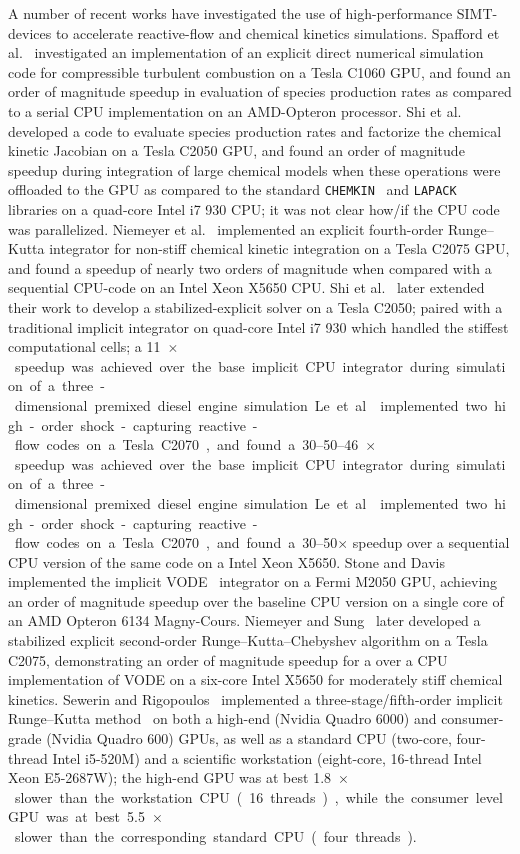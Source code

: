 \documentclass[12pt,number,sort&compress,preprint]{elsarticle}
\begin{document}
A number of recent works have investigated the use of high-performance SIMT-devices to accelerate reactive-flow and chemical kinetics simulations.
Spafford et al.~\cite{Spafford:2010aa} investigated an implementation of an explicit direct numerical simulation code for compressible turbulent combustion on a Tesla C1060 GPU, and found an order of magnitude speedup in evaluation of species production rates as compared to a serial CPU implementation on an AMD-Opteron processor.
Shi et al.~\cite{Shi:2011aa} developed a code to evaluate species production rates and factorize the chemical kinetic Jacobian on a Tesla C2050 GPU, and found an order of magnitude speedup during integration of large chemical models when these operations were offloaded to the GPU as compared to the standard \texttt{CHEMKIN}~\cite{kee1989chemkin} and \texttt{LAPACK}~\cite{Anderson:1999aa} libraries on a quad-core Intel i7 930 CPU; it was not clear how\slash if the CPU code was parallelized.
Niemeyer et al.~\cite{Niemeyer:2011aa} implemented an explicit fourth-order Runge--Kutta integrator for non-stiff chemical kinetic integration on a Tesla C2075 GPU, and found a speedup of nearly two orders of magnitude when compared with a sequential CPU-code on an Intel Xeon X5650 CPU.
Shi et al.~\cite{Shi:2012aa} later extended their work to develop a stabilized-explicit solver on a Tesla C2050; paired with a traditional implicit integrator on quad-core Intel i7 930 which handled the stiffest computational cells; a \SIrange{11}{46}{$\times$} speedup was achieved over the base implicit CPU integrator during simulation of a three-dimensional premixed diesel engine simulation.
Le et al.~\cite{Le2013596} implemented two high-order shock-capturing reactive-flow codes on a Tesla C2070, and found a \numrange{30}{50}$\times$ speedup over a sequential CPU version of the same code on a Intel Xeon X5650.
Stone and Davis~\cite{Stone:2013aa} implemented the implicit VODE~\cite{Brown:1989vl} integrator on a Fermi M2050 GPU, achieving an order of magnitude speedup over the baseline CPU version on a single core of an AMD Opteron 6134 Magny-Cours.
Niemeyer and Sung~\cite{Niemeyer:2014aa} later developed a stabilized explicit second-order Runge--Kutta--Chebyshev algorithm on a Tesla C2075, demonstrating an order of magnitude speedup for a over a CPU implementation of VODE on a six-core Intel X5650 for moderately stiff chemical kinetics.
Sewerin and Rigopoulos~\cite{Sewerin20151375} implemented a three-stage\slash fifth-order implicit Runge--Kutta method~\cite{wanner1991solving} on both a high-end (Nvidia Quadro 6000) and consumer-grade (Nvidia Quadro 600) GPUs, as well as a standard CPU (two-core, four-thread Intel i5-520M) and a scientific workstation (eight-core, 16-thread Intel Xeon E5-2687W); the high-end GPU was at best \SI{1.8}{$\times$} slower than the workstation CPU (16 threads), while the consumer level GPU was at best \SI{5.5}{$\times$} slower than the corresponding standard CPU (four threads).
\end{document}
